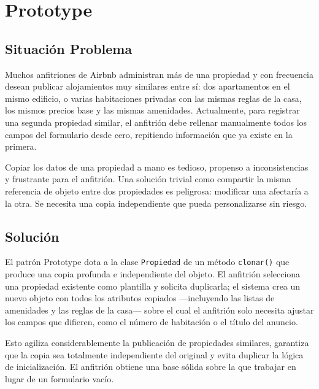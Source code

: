 
\chapter{Prototype}

\section{Situación Problema}

Muchos anfitriones de Airbnb administran más de una propiedad y con
frecuencia desean publicar alojamientos muy similares entre sí: dos
apartamentos en el mismo edificio, o varias habitaciones privadas con
las mismas reglas de la casa, los mismos precios base y las mismas
amenidades. Actualmente, para registrar una segunda propiedad similar,
el anfitrión debe rellenar manualmente todos los campos del formulario
desde cero, repitiendo información que ya existe en la primera.

Copiar los datos de una propiedad a mano es tedioso, propenso a
inconsistencias y frustrante para el anfitrión. Una solución trivial
como compartir la misma referencia de objeto entre dos propiedades es
peligrosa: modificar una afectaría a la otra. Se necesita una copia
independiente que pueda personalizarse sin riesgo.

\section{Solución}

El patrón Prototype dota a la clase \texttt{Propiedad} de un método
\texttt{clonar()} que produce una copia profunda e independiente del
objeto. El anfitrión selecciona una propiedad existente como plantilla
y solicita duplicarla; el sistema crea un nuevo objeto con todos los
atributos copiados —incluyendo las listas de amenidades y las reglas
de la casa— sobre el cual el anfitrión solo necesita ajustar los campos
que difieren, como el número de habitación o el título del anuncio.

Esto agiliza considerablemente la publicación de propiedades similares,
garantiza que la copia sea totalmente independiente del original y evita
duplicar la lógica de inicialización. El anfitrión obtiene una base
sólida sobre la que trabajar en lugar de un formulario vacío.

